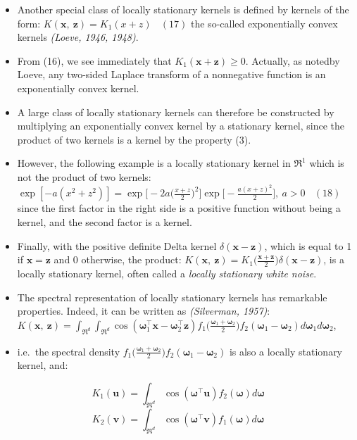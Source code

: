 \documentclass[
  ignorenonframetext,
]{beamer}
\begin{document}
\begin{frame}{}
\protect\hypertarget{section-11}{}
\begin{itemize}
\item
  Another special class of locally stationary kernels is defined by
  kernels of the form: \(K(\pmb x,\ \pmb z) = K_1(x + z) \ \ \ \ (17)\)
  the so-called exponentially convex kernels \emph{(Loeve, 1946, 1948)}.
\item
  From (16), we see immediately that \(K_1(\pmb x + \pmb z) \geq 0\).
  Actually, as notedby Loeve, any two-sided Laplace transform of a
  nonnegative function is an exponentially convex kernel.
\end{itemize}
\end{frame}

\begin{frame}{}
\protect\hypertarget{section-12}{}
\begin{itemize}
\item
  A large class of locally stationary kernels can therefore be
  constructed by multiplying an exponentially convex kernel by a
  stationary kernel, since the product of two kernels is a kernel by the
  property (3).
\item
  However, the following example is a locally stationary kernel in
  \(\mathfrak R^1\) which is not the product of two kernels:
  \(\exp[-a(x^2+z^2)]=\exp \Big[-2a\big(\frac {x+z} 2\big)^2\Big] \exp\Big[-\frac {a(x+z)^2} 2\Big],\ a>0 \ \ \ \ (18)\)
  since the first factor in the right side is a positive function
  without being a kernel, and the second factor is a kernel.
\end{itemize}
\end{frame}

\begin{frame}{}
\protect\hypertarget{section-13}{}
\begin{itemize}
\item
  Finally, with the positive definite Delta kernel
  \(\delta(\pmb x - \pmb z)\), which is equal to 1 if
  \(\pmb x = \pmb z\) and 0 otherwise, the product:
  \(K(\pmb x,\ \pmb z) = K_1\Big(\frac {\pmb x + \pmb z} 2\Big) \delta(\pmb x - \pmb z)\),
  is a locally stationary kernel, often called a \emph{locally
  stationary white noise}.
\item
  The spectral representation of locally stationary kernels has
  remarkable properties. Indeed, it can be written as \emph{(Silverman,
  1957)}:
  \(K(\pmb x,\ \pmb z) = \int_{\mathfrak R^d} \int_{\mathfrak R^d} \cos(\pmb \omega^{\top}_1 \pmb x - \pmb\omega ^{\top}_2 \pmb z) f_1\big(\frac {\pmb\omega_1+\pmb\omega_2} 2\big) f_2(\pmb\omega_1-\pmb\omega_2)d\pmb\omega_1d\pmb\omega_2\),
\item
  i.e.~the spectral density
  \(f_1\big(\frac{\pmb\omega_1+\pmb\omega_2}{2}\big)f_2(\pmb\omega_1-\pmb\omega_2)\)
  is also a locally stationary kernel, and:
\end{itemize}

\[
K_1(\pmb u)=\int_{\mathfrak R^d}\cos(\pmb\omega^{\top}\pmb u)f_2(\pmb\omega)d\pmb\omega
\] \vspace{5mm} \[
K_2(\pmb v)=\int_{\mathfrak R^d}\cos(\pmb\omega^{\top}\pmb v)f_1(\pmb\omega)d\pmb\omega
\]
\end{frame}
\end{document}
